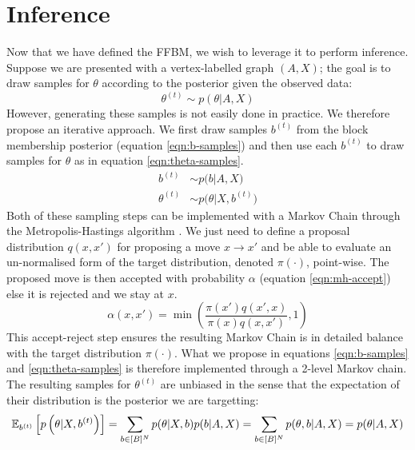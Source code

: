 \section{Inference}
\label{sec:inference}

Now that we have defined the FFBM, we wish to leverage it to perform inference. Suppose we are presented with a vertex-labelled graph $(A, X)$; the goal is to draw samples for $\theta$ according to the posterior given the observed data:
%
\begin{equation}
	\label{eqn:theta-target}
	\theta^{(t)} \sim p(\theta | A, X)
\end{equation}
%
However, generating these samples is not easily done in practice. We therefore propose an iterative approach. We first draw samples $b^{(t)}$ from the block membership posterior (equation \ref{eqn:b-samples}) and then use each $b^{(t)}$ to draw samples for $\theta$ as in equation \ref{eqn:theta-samples}. 
%
\begin{align}
	b^{(t)} &\sim p \Big( b | A, X \Big)  \label{eqn:b-samples}\\
	\theta^{(t)} &\sim p\Big(\theta | X, b^{(t)} \Big) \label{eqn:theta-samples}
\end{align}
%
Both of these sampling steps can be implemented with a Markov Chain through the Metropolis-Hastings algorithm \cite{hastings-alg}. We just need to define a proposal distribution $q(x, x')$ for proposing a move $x \rightarrow x'$ and be able to evaluate an un-normalised form of the target distribution, denoted $\pi(\cdot)$, point-wise. The proposed move is then accepted with probability $\alpha$ (equation \ref{eqn:mh-accept}) else it is rejected and we stay at $x$.
%
\begin{equation}
	\alpha(x, x') = \min \left( \frac{\pi(x') q(x', x)}{\pi(x) q(x, x')} , 1 \right)
	\label{eqn:mh-accept}
\end{equation}
%
This accept-reject step ensures the resulting Markov Chain is in detailed balance with the target distribution $\pi(\cdot)$. What we propose in equations \ref{eqn:b-samples} and \ref{eqn:theta-samples} is therefore implemented through a 2-level Markov chain. The resulting samples for $\theta^{(t)}$ are unbiased in the sense that the expectation of their distribution is the posterior we are targetting:
%
\begin{equation}
\mathbb{E}_{b^{(t)}} \left[p \left( \theta | X, b^{(t)} \right) \right] = \sum_{b \in [B]^N} p(\theta | X, b) p(b | A, X) = \sum_{b \in [B]^N} p(\theta, b | A, X) = p(\theta | A, X)
\label{eqn:theta-unbiased}
\end{equation}

